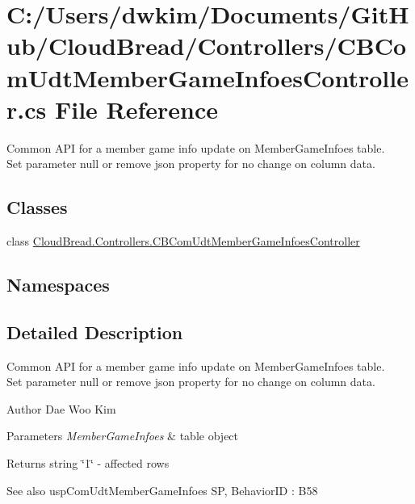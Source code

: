 \hypertarget{a00135}{}\section{C\+:/\+Users/dwkim/\+Documents/\+Git\+Hub/\+Cloud\+Bread/\+Controllers/\+C\+B\+Com\+Udt\+Member\+Game\+Infoes\+Controller.cs File Reference}
\label{a00135}


Common A\+PI for a member game info update on Member\+Game\+Infoes table. ~\newline
Set parameter null or remove json property for no change on column data.  


\subsection*{Classes}
\begin{DoxyCompactItemize}
\item 
class \hyperlink{a00023}{Cloud\+Bread.\+Controllers.\+C\+B\+Com\+Udt\+Member\+Game\+Infoes\+Controller}
\end{DoxyCompactItemize}
\subsection*{Namespaces}
\begin{DoxyCompactItemize}
\end{DoxyCompactItemize}


\subsection{Detailed Description}
Common A\+PI for a member game info update on Member\+Game\+Infoes table. ~\newline
Set parameter null or remove json property for no change on column data. 

\begin{DoxyAuthor}{Author}
Dae Woo Kim 
\end{DoxyAuthor}

\begin{DoxyParams}{Parameters}
{\em Member\+Game\+Infoes} & table object \\
\hline
\end{DoxyParams}
\begin{DoxyReturn}{Returns}
string \char`\"{}1\char`\"{} -\/ affected rows 
\end{DoxyReturn}
\begin{DoxySeeAlso}{See also}
usp\+Com\+Udt\+Member\+Game\+Infoes SP, Behavior\+ID \+: B58 
\end{DoxySeeAlso}
